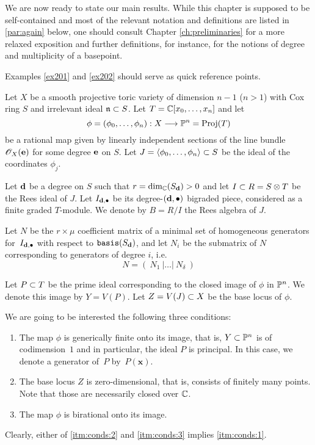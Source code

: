 \documentclass[fleqn,reqno]{amsart}
\begin{document}



\begin{paragraf*}
We are now ready to state our main results.
While this chapter is supposed to be self-contained and most of the relevant notation
and definitions are listed in \eqref{par:again} below,
one should consult Chapter \ref{ch:preliminaries} for a more relaxed exposition
and further definitions, for instance,
for the notions of degree and multiplicity of a basepoint.

Examples \ref{ex201} and \ref{ex202} should serve as quick reference points.
\end{paragraf*}

\begin{paragraf}
\label{par:again}
\label{par:setup}
Let $X$ be a smooth projective toric variety of dimension $n-1$ ($n>1$)
with Cox ring $S$ and irrelevant ideal $\mathfrak{n}\subset S$.
Let $T=\mathbb{C}[x_0,\ldots,x_n]$ and let
\[
\phi=(\phi_0,\ldots,\phi_n):X\longrightarrow\mathbb{P}^n=\operatorname{Proj}(T)
\]
be a rational map given by linearly independent sections of the line bundle $\mathscr{O}_X(\mathbf e)$
for some degree $\mathbf e$ on $S$.
Let $J=\langle \phi_0,\ldots,\phi_n\rangle\subset S$ be the ideal of the coordinates $\phi_j$.

Let $\mathbf d$ be a degree on $S$ such that $r=\dim_{\mathbb{C}}(S_\mathbf d)>0$ and
let $I\subset R=S\otimes T$ be the Rees ideal of $J$.
Let $I_{\mathbf d,\bullet}$ be its degree-$(\mathbf d,\bullet)$ bigraded piece,
considered as a finite graded $T$-module.
We denote by $B=R/I$ the Rees algebra of $J$.

Let $N$ be the $r\times\mu$ coefficient matrix of
a minimal set of homogeneous generators for~$I_{\mathbf d,\bullet}$ with respect to $\mathop{\tt basis}(S_\mathbf d)$,
and let $N_i$ be the submatrix of $N$ corresponding to generators of degree $i$, i.e.
\[
N=(~N_1~|\ldots|~N_\delta~)
\]
\end{paragraf}

\begin{paragraf}
\label{par:conds}
Let $P\subset T$ be the prime ideal corresponding to the closed image of $\phi$ in $\mathbb{P}^n$.
We denote this image by $Y=V(P)$.
Let $Z=V(J)\subset X$ be the base locus of $\phi$.

We are going to be interested the following three conditions:
\begin{enumerate}
\item
\label{itm:conds:1}
The map $\phi$ is generically finite onto its image, that is,
$Y\subset\mathbb{P}^n$ is of codimension~$1$ and in particular, the ideal $P$ is principal.
In this case, we denote a generator of~$P$ by~$P(\mathbf x)$.

\item
\label{itm:conds:2} The base locus $Z$ is zero-dimensional, that is,
consists of finitely many points.
Note that those are necessarily closed over $\mathbb{C}$.

\item
\label{itm:conds:3} The map $\phi$ is birational onto its image.
\end{enumerate}

Clearly, either of \eqref{itm:conds:2} and \eqref{itm:conds:3} implies \eqref{itm:conds:1}.
\end{paragraf}
\end{document}
